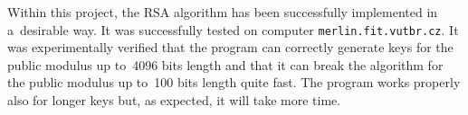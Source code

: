 \documentclass[a4paper, 10pt, twocolumn]{article}
\begin{document}
    Within this project, the RSA algorithm has been successfully
    implemented in a~desirable way. It was successfully tested on
    computer \texttt{merlin.fit.vutbr.cz}. It was experimentally
    verified that the program can correctly generate keys for the public
    modulus up to~4096 bits length and that it can break the algorithm
    for the public modulus up to~100 bits length quite fast. The program
    works properly also for longer keys but, as expected, it will take
    more time.


    
    \renewcommand{\refname}{Bibliography}
    
\end{document}

